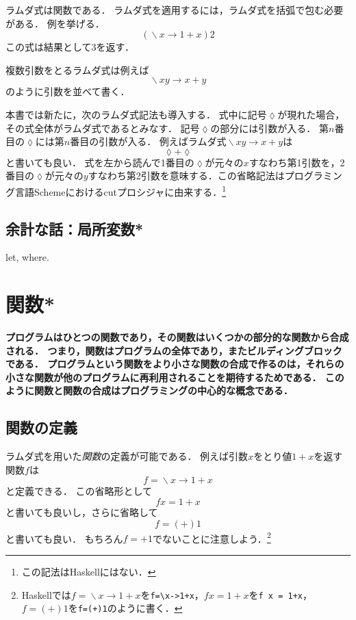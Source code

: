 \documentclass[twocolumn]{jsbook}
\DeclareMathOperator{\mathLambda}{\backslash}
\newcommand{\mathLambdaAnonymousParameter}{\lozenge}
\newcommand{\mathLambdaArrow}{\rightarrow}
\newcommand{\mathLambdaExpression}[2]{\mathLambda#1\mathLambdaArrow#2}
\newcommand{\keyword}[1]{\emph{#1}}
\newcommand{\code}[1]{\texttt{#1}}
\newenvironment{leader}{\begingroup\bf}{\endgroup}
\begin{document}
ラムダ式は関数である．
ラムダ式を適用するには，ラムダ式を括弧で包む必要がある．
例を挙げる．
$$\left(\mathLambdaExpression{x}{1+x}\right)2$$
この式は結果として$3$を返す．

複数引数をとるラムダ式は例えば$$\mathLambdaExpression{xy}{x+y}$$のように引数を並べて書く．

本書では新たに，次のラムダ式記法も導入する．
式中に記号$\mathLambdaAnonymousParameter$が現れた場合，その式全体がラムダ式であるとみなす．
記号$\mathLambdaAnonymousParameter$の部分には引数が入る．
第$n$番目の$\mathLambdaAnonymousParameter$には第$n$番目の引数が入る．
例えばラムダ式$\mathLambdaExpression{xy}{x+y}$は$$\mathLambdaAnonymousParameter+\mathLambdaAnonymousParameter$$と書いても良い．
式を左から読んで1番目の$\mathLambdaAnonymousParameter$が元々の$x$すなわち第1引数を，2番目の$\mathLambdaAnonymousParameter$が元々の$y$すなわち第2引数を意味する．この省略記法はプログラミング言語Schemeにおけるcutプロシジャに由来する．\footnote{この記法はHaskellにはない．}

\section*{余計な話：局所変数*}

let, where.

\chapter{関数*}

\begin{leader}
プログラムはひとつの関数であり，その関数はいくつかの部分的な関数から合成される．
つまり，関数はプログラムの全体であり，またビルディングブロックである．
プログラムという関数をより小さな関数の合成で作るのは，それらの小さな関数が他のプログラムに再利用されることを期待するためである．
このように関数と関数の合成はプログラミングの中心的な概念である．
\end{leader}

\section{関数の定義}

ラムダ式を用いた\keyword{関数}の定義が可能である．
例えば引数$x$をとり値$1+x$を返す関数$f$は$$f=\mathLambdaExpression{x}{1+x}$$と定義できる．
この省略形として$$fx=1+x$$と書いても良いし，さらに省略して$$f=(+)1$$と書いても良い．
もちろん$f=+1$でないことに注意しよう．\footnote{Haskellでは$f=\mathLambdaExpression{x}{1+x}$を\code{f=\textbackslash x->1+x}，$fx=1+x$を\code{f x = 1+x}，$f=(+)1$を\code{f=(+)1}のように書く．}
\end{document}
